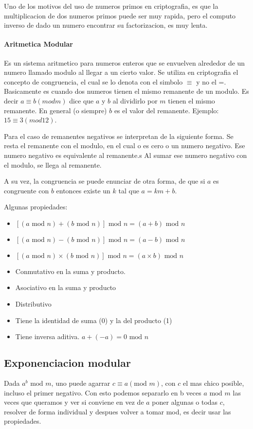\documentclass[12pt, oneside]{article}
\begin{document}
Uno de los motivos del uso de numeros primos en criptografia, es que la multiplicacion
de dos numeros primos puede ser muy rapida, pero el computo inverso de dado un numero
encontrar su factorizacion, es muy lenta.



 \paragraph{Aritmetica Modular}
Es un sistema aritmetico para numeros enteros que se envuelven alrededor
de un numero llamado modulo al llegar a un cierto valor.
Se utiliza en criptografia el concepto de congruencia, el cual se lo denota con
el simbolo $\equiv$ y no el =.
Basicamente es cuando dos numeros tienen el mismo remanente de un modulo.
Es decir $a \equiv b (mod m)$ dice que $a$ y $b$ al dividirlo por $m$ tienen el mismo
remanente.
En general (o siempre) $b$ es el valor del remanente.
Ejemplo: $15\equiv 3 (mod 12)$.

Para el caso de remanentes negativos se interpretan de la siguiente forma.
Se resta el remanente con el modulo, en el cual o es cero o un numero negativo.
Ese numero negativo es equivalente al remanente.s
Al sumar ese numero negativo con el modulo, se llega al remanente.

A su vez, la congruencia se puede enunciar de otra forma, de que si $a$ es congruente
con $b$ entonces existe un $k$ tal que $a=km+b$.

Algunas propiedades:
\begin{itemize}
    \item $[(a\text{ mod }n) + (b\text{ mod }n)]\text{ mod }n = (a+b)\text{ mod }n$
    \item $[(a\text{ mod }n) - (b\text{ mod }n)]\text{ mod }n = (a-b)\text{ mod }n$
    \item $[(a\text{ mod }n) \times (b\text{ mod }n)]\text{ mod }n = (a\times b)\text{ mod }n$
    \item Conmutativo en la suma y producto.
    \item Asociativo en la suma y producto
    \item Distributivo
    \item Tiene la identidad de suma (0) y la del producto (1)
    \item Tiene inversa aditiva. $a+(-a) = 0\text{ mod }n$
\end{itemize}



\subsection{Exponenciacion modular}
Dada $a^b\text{ mod }m$, uno puede agarrar $c \equiv a (\text{mod }m)$, con $c$
el mas chico posible, incluso el primer negativo.
Con esto podemos separarlo en b veces $a \text{ mod }m$ las veces que queramos
y ver si conviene en vez de $a$ poner algunas o todas $c$, resolver de forma
individual y despues volver a tomar  mod, es decir usar las propiedades.
\end{document}
